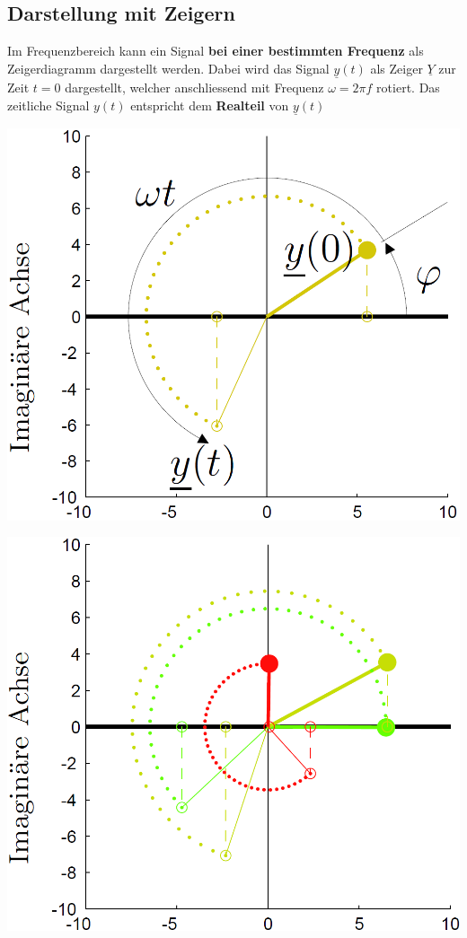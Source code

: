 \subsection{Darstellung mit Zeigern}

Im Frequenzbereich kann ein Signal \textbf{bei einer bestimmten Frequenz} als Zeigerdiagramm dargestellt werden.
Dabei wird das Signal $\underline{y}(t)$ als Zeiger $\underline{Y}$ zur Zeit $t=0$ dargestellt, welcher anschliessend mit Frequenz $\omega = 2 \pi f$ rotiert.
Das zeitliche Signal $y(t)$ entspricht dem \textbf{Realteil} von $\underline{y}(t)$

\begin{minipage}[c]{0.4\columnwidth}
    \includegraphics[width=\columnwidth]{images/zeigerdiagramm_1.png}
\end{minipage}
\hfill
\begin{minipage}[c]{0.4\columnwidth}
    \includegraphics[width=\columnwidth]{images/zeigerdiagramm_2.png}
\end{minipage}


